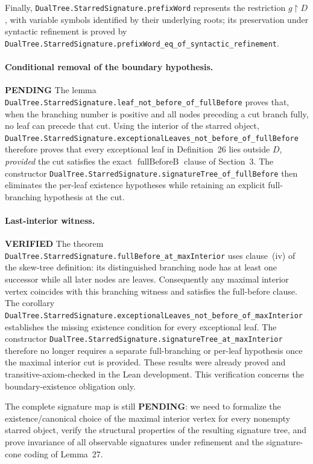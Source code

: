 \documentclass[11pt]{article}
\newcommand{\ok}{\textcolor{green!40!black}{\textbf{VERIFIED}}}
\newcommand{\todo}{\textcolor{gray!70!black}{\textbf{PENDING}}}
\newcommand{\lean}[1]{\texttt{#1}}
\begin{document}
Finally, \lean{DualTree.StarredSignature.prefixWord} represents the
restriction $g\upharpoonright D$, with variable symbols identified
by their underlying roots; its preservation under syntactic refinement
is proved by
\lean{DualTree.StarredSignature.prefixWord_eq_of_syntactic_refinement}.

\paragraph{Conditional removal of the boundary hypothesis.} \todo
The lemma \lean{DualTree.StarredSignature.leaf_not_before_of_fullBefore}
proves that, when the branching number is positive and all nodes
preceding a cut branch fully, no leaf can precede that cut.
Using the interior of the starred object,
\lean{DualTree.StarredSignature.exceptionalLeaves_not_before_of_fullBefore}
therefore proves that every exceptional leaf in Definition~26 lies outside
$D$, \emph{provided} the cut satisfies the exact
$\operatorname{fullBeforeB}$ clause of Section~3.
The constructor
\lean{DualTree.StarredSignature.signatureTree_of_fullBefore}
then eliminates the per-leaf existence hypotheses while retaining an
explicit full-branching hypothesis at the cut.

\paragraph{Last-interior witness.} \ok
The theorem
\lean{DualTree.StarredSignature.fullBefore_at_maxInterior}
uses clause~(iv) of the skew-tree definition: its distinguished branching
node has at least one successor while all later nodes are leaves.
Consequently any maximal interior vertex coincides with this branching
witness and satisfies the full-before clause.  The corollary
\lean{DualTree.StarredSignature.exceptionalLeaves_not_before_of_maxInterior}
establishes the missing existence condition for every exceptional leaf.
The constructor
\lean{DualTree.StarredSignature.signatureTree_at_maxInterior}
therefore no longer requires a separate full-branching or per-leaf
hypothesis once the maximal interior cut is provided.  These results
were already proved and transitive-axiom-checked in the Lean development.
This verification concerns the boundary-existence obligation only.

The complete signature map is still \todo: we need to formalize the
existence/canonical choice of the maximal interior vertex for every
nonempty starred object, verify the structural properties of the
resulting signature tree, and prove invariance of all observable
signatures under refinement and the signature-cone coding of Lemma~27.
\end{document}
